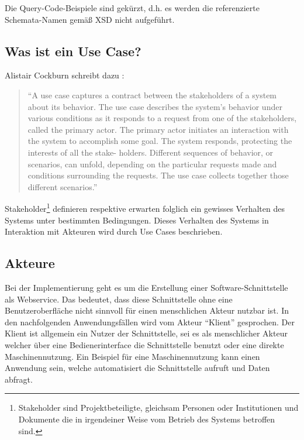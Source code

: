 Die Query-Code-Beispiele sind gekürzt, d.h. es werden die referenzierte Schemata-Namen gemäß XSD nicht aufgeführt. 

\subsection{Was ist ein Use Case?}

Alistair Cockburn schreibt dazu \citep[Vergl.][Kap. 1.1]{cockburn2000}:

\begin{quotation}
\enquote{A use case captures a contract between the stakeholders of a system about its behavior. The use case describes the system’s behavior under various conditions as it responds to a request from one of the stakeholders, called the primary actor. The primary actor initiates an interaction with the system to accomplish some goal. The system responds, protecting the interests of all the stake- holders. Different sequences of behavior, or scenarios, can unfold, depending on the particular requests made and conditions surrounding the requests. The use case collects together those different scenarios.}
\end{quotation}

\gls{Stakeholder}\footnote{Stakeholder sind Projektbeteiligte, gleichsam Personen oder Institutionen und Dokumente die in irgendeiner Weise vom Betrieb des Systems betroffen sind.} definieren respektive erwarten folglich ein gewisses Verhalten des Systems unter bestimmten Bedingungen. Dieses Verhalten des Systems in Interaktion mit Akteuren wird durch \glspl{Use Case} beschrieben.


\subsection{Akteure}
Bei der Implementierung geht es um die Erstellung einer Software-Schnittstelle als \gls{Webservice}. Das bedeutet, dass diese Schnittstelle ohne eine Benutzeroberfläche nicht sinnvoll für einen menschlichen Akteur nutzbar ist. In den nachfolgenden Anwendungsfällen wird vom Akteur \enquote{Klient} gesprochen. Der Klient ist allgemein ein Nutzer der Schnittstelle, sei es als menschlicher Akteur welcher über eine Bedienerinterface die Schnittstelle benutzt oder eine direkte Maschinennutzung. Ein Beispiel für eine Maschinennutzung kann einen Anwendung sein, welche automatisiert die Schnittstelle aufruft und Daten abfragt.    

